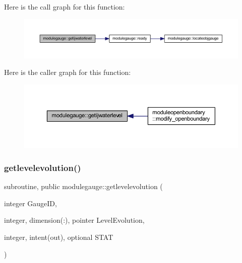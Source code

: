 Here is the call graph for this function\+:\nopagebreak
\begin{figure}[H]
\begin{center}
\leavevmode
\includegraphics[width=350pt]{namespacemodulegauge_aa7b1b101cf558db427ad03b4a0e72f09_cgraph}
\end{center}
\end{figure}
Here is the caller graph for this function\+:\nopagebreak
\begin{figure}[H]
\begin{center}
\leavevmode
\includegraphics[width=350pt]{namespacemodulegauge_aa7b1b101cf558db427ad03b4a0e72f09_icgraph}
\end{center}
\end{figure}
\mbox{\label{namespacemodulegauge_aeb445b9f9d227121a220ceafb472ec2c}} 
\subsubsection{\texorpdfstring{getlevelevolution()}{getlevelevolution()}}
{\footnotesize\ttfamily subroutine, public modulegauge\+::getlevelevolution (\begin{DoxyParamCaption}\item[{integer}]{Gauge\+ID,  }\item[{integer, dimension(\+:), pointer}]{Level\+Evolution,  }\item[{integer, intent(out), optional}]{S\+T\+AT }\end{DoxyParamCaption})}

